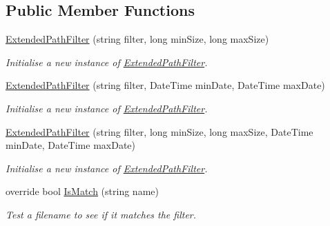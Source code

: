 \subsection*{Public Member Functions}
\begin{DoxyCompactItemize}
\item 
\hyperlink{class_i_c_sharp_code_1_1_sharp_zip_lib_1_1_core_1_1_extended_path_filter_a27d7833448d6596a63f2974765de4fd3}{Extended\+Path\+Filter} (string filter, long min\+Size, long max\+Size)
\begin{DoxyCompactList}\small\item\em Initialise a new instance of \hyperlink{class_i_c_sharp_code_1_1_sharp_zip_lib_1_1_core_1_1_extended_path_filter}{Extended\+Path\+Filter}. \end{DoxyCompactList}\item 
\hyperlink{class_i_c_sharp_code_1_1_sharp_zip_lib_1_1_core_1_1_extended_path_filter_a0b3ca801aa21b1e6e70e469c53c898b8}{Extended\+Path\+Filter} (string filter, Date\+Time min\+Date, Date\+Time max\+Date)
\begin{DoxyCompactList}\small\item\em Initialise a new instance of \hyperlink{class_i_c_sharp_code_1_1_sharp_zip_lib_1_1_core_1_1_extended_path_filter}{Extended\+Path\+Filter}. \end{DoxyCompactList}\item 
\hyperlink{class_i_c_sharp_code_1_1_sharp_zip_lib_1_1_core_1_1_extended_path_filter_ab1c9bc916dae3b52681ac8db424b1c3e}{Extended\+Path\+Filter} (string filter, long min\+Size, long max\+Size, Date\+Time min\+Date, Date\+Time max\+Date)
\begin{DoxyCompactList}\small\item\em Initialise a new instance of \hyperlink{class_i_c_sharp_code_1_1_sharp_zip_lib_1_1_core_1_1_extended_path_filter}{Extended\+Path\+Filter}. \end{DoxyCompactList}\item 
override bool \hyperlink{class_i_c_sharp_code_1_1_sharp_zip_lib_1_1_core_1_1_extended_path_filter_a4d66921d72a1b16622a14083b2fb790d}{Is\+Match} (string name)
\begin{DoxyCompactList}\small\item\em Test a filename to see if it matches the filter. \end{DoxyCompactList}\end{DoxyCompactItemize}
